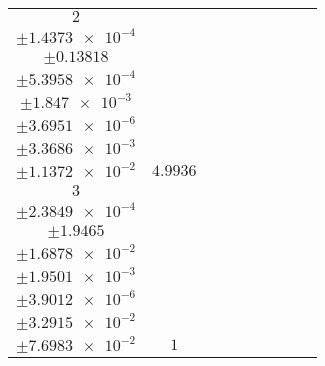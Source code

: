 \documentclass[8pt]{article}
\begin{document}
\begin{longtable}[l]{c c c c c c c c c}
$\num{2}$ & \begin{tabular}[c]{@{}c@{}}$\num{5.9836e-2}$ \\ $\pm\num{1.4373e-4}$\end{tabular} & \begin{tabular}[c]{@{}c@{}}$\num{-0.97957}$ \\ $\pm\num{0.13818}$\end{tabular} & \begin{tabular}[c]{@{}c@{}}$\num{-6.9962}$ \\ $\pm\num{5.3958e-4}$\end{tabular} & \begin{tabular}[c]{@{}c@{}}$\num{1.559e+3}$ \\ $\pm\num{1.847e-3}$\end{tabular} & \begin{tabular}[c]{@{}c@{}}$\num{3.119}$ \\ $\pm\num{3.6951e-6}$\end{tabular} & \begin{tabular}[c]{@{}c@{}}$\num{1.1654}$ \\ $\pm\num{3.3686e-3}$\end{tabular} & \begin{tabular}[c]{@{}c@{}}$\num{4.1603}$ \\ $\pm\num{1.1372e-2}$\end{tabular} & $\num{4.9936}$\\
$\num{3}$ & \begin{tabular}[c]{@{}c@{}}$\num{1.3494e-2}$ \\ $\pm\num{2.3849e-4}$\end{tabular} & \begin{tabular}[c]{@{}c@{}}$\num{-0.31057}$ \\ $\pm\num{1.9465}$\end{tabular} & \begin{tabular}[c]{@{}c@{}}$\num{-5.5205}$ \\ $\pm\num{1.6878e-2}$\end{tabular} & \begin{tabular}[c]{@{}c@{}}$\num{1.5692e+3}$ \\ $\pm\num{1.9501e-3}$\end{tabular} & \begin{tabular}[c]{@{}c@{}}$\num{3.1393}$ \\ $\pm\num{3.9012e-6}$\end{tabular} & \begin{tabular}[c]{@{}c@{}}$\num{2.4112}$ \\ $\pm\num{3.2915e-2}$\end{tabular} & \begin{tabular}[c]{@{}c@{}}$\num{4.4179}$ \\ $\pm\num{7.6983e-2}$\end{tabular} & $\num{1}$\\

\end{longtable}
\end{document}
